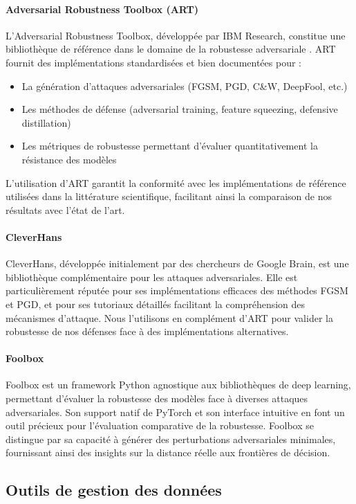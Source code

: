 \paragraph{Adversarial Robustness Toolbox (ART)}
L'Adversarial Robustness Toolbox, développée par IBM Research, constitue une bibliothèque de référence dans le domaine de la robustesse adversariale \cite{nicolae2018adversarial}. ART fournit des implémentations standardisées et bien documentées pour :
\begin{itemize}
    \item La génération d'attaques adversariales (FGSM, PGD, C\&W, DeepFool, etc.)
    \item Les méthodes de défense (adversarial training, feature squeezing, defensive distillation)
    \item Les métriques de robustesse permettant d'évaluer quantitativement la résistance des modèles
\end{itemize}
L'utilisation d'ART garantit la conformité avec les implémentations de référence utilisées dans la littérature scientifique, facilitant ainsi la comparaison de nos résultats avec l'état de l'art.

\paragraph{CleverHans}
CleverHans, développée initialement par des chercheurs de Google Brain, est une bibliothèque complémentaire pour les attaques adversariales. Elle est particulièrement réputée pour ses implémentations efficaces des méthodes FGSM et PGD, et pour ses tutoriaux détaillés facilitant la compréhension des mécanismes d'attaque. Nous l'utilisons en complément d'ART pour valider la robustesse de nos défenses face à des implémentations alternatives.

\paragraph{Foolbox}
Foolbox est un framework Python agnostique aux bibliothèques de deep learning, permettant d'évaluer la robustesse des modèles face à diverses attaques adversariales. Son support natif de PyTorch et son interface intuitive en font un outil précieux pour l'évaluation comparative de la robustesse. Foolbox se distingue par sa capacité à générer des perturbations adversariales minimales, fournissant ainsi des insights sur la distance réelle aux frontières de décision.

\subsection{Outils de gestion des données}

